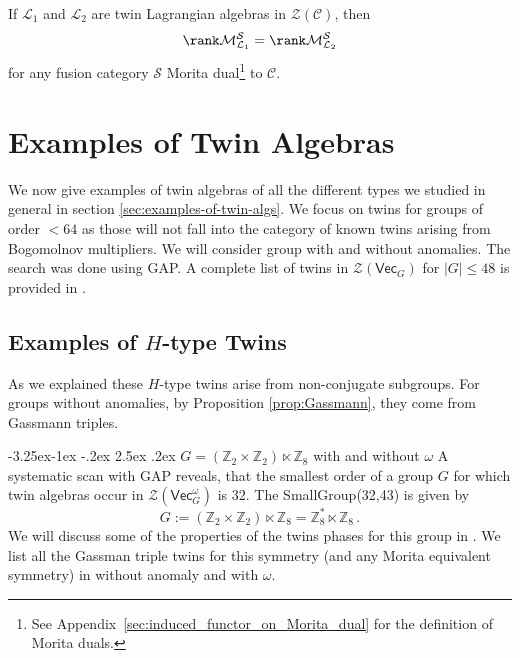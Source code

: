 \documentclass[aps,twocolumn,prx,floatfix,preprintnumbers, nofootinbib,10pt]{revtex4-2}
\makeatletter
\numberwithin{equation}{section}
\theoremstyle{definition}
\newcommand{\be}{\begin{equation}}
\newcommand{\ee}{\end{equation}}
\newcommand{\Z}{{\mathbb Z}}
\newcommand{\cC}{\mathcal{C}}
\newcommand{\cL}{\mathcal{L}}
\newcommand{\cM}{\mathcal{M}}
\newcommand{\cS}{\mathcal{S}}
\newcommand{\cZ}{\mathcal{Z}}
\renewcommand{\Vec}{\mathsf{Vec}}
\renewcommand\subsubsection{\@startsection{subsubsection}{3}{\z@}%
                                     {-3.25ex\@plus -1ex \@minus -.2ex}%
                                     {2.5ex \@plus .2ex}%
                                     {\centering\itshape\bfseries\small}}
\makeatother
\begin{document}
    If $\cL_1$ and $\cL_2$ are twin Lagrangian algebras in $\cZ(\cC)$, then
    \begin{equation}
        \rank \cM_{\cL_1}^{\cS} =\rank \cM_{\cL_2}^{\cS}
    \end{equation}
    for any fusion category $\cS$ Morita dual\footnote{See Appendix~\ref{sec:induced_functor_on_Morita_dual} for the definition of Morita duals.} to $\cC$.










\section{Examples of Twin Algebras} 
\label{sec:DoubTroub}

We now give examples of twin algebras of all the different types we studied in general in section \ref{sec:examples-of-twin-algs}. We focus on twins for groups of order $< 64$ as those will not fall into the category of known twins arising from Bogomolnov multipliers. We will consider group with and without anomalies. The search was done using GAP.
A complete list of twins in $\cZ (\Vec_{G})$ for $|G|\leq 48$ is provided in .

\subsection{Examples of $H$-type Twins}
\label{sec:Ex-Htype}

As we explained these $H$-type twins arise from non-conjugate subgroups. For groups without anomalies, by Proposition \ref{prop:Gassmann}, they come from Gassmann triples. 

\subsubsection{$G=(\Z_2 \times \Z_2) \ltimes \Z_8$ with and without $\omega$}
A systematic scan with GAP reveals, that the smallest order of a group $G$ for which twin algebras occur in $\cZ(\Vec_G^\omega)$ is $32$.
The SmallGroup(32,43) is given by 
\be\label{G32Def}
    G:=(\Z_2 \times \Z_2) \ltimes \Z_8 = \Z_8^*\ltimes \Z_8  \,.
\ee
We will discuss some of the properties of the twins phases for this group in . We list all the Gassman triple twins for this symmetry (and any Morita equivalent symmetry) in  without anomaly and  with $\omega$. 
\end{document}
